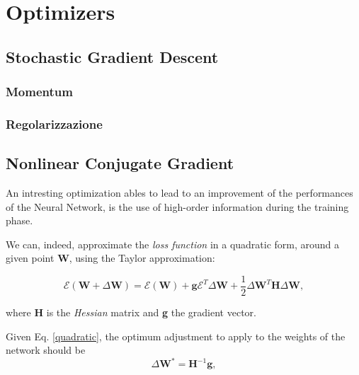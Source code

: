 \chapter{Optimizers} %
\label{cha:optimizers}
	\section{Stochastic Gradient Descent} %
	\label{sec:sgd}
	

		\subsection{Momentum} %
		\label{sec:momentum}
		

		\subsection{Regolarizzazione} %
		\label{sec:regolarizzazione}

	\section{Nonlinear Conjugate Gradient} %
	\label{sec:nonlinear_conjugate_gradient}
	
		An intresting optimization ables to lead to an improvement of the performances of the Neural Network, is the use of high-order information during the training phase.

		We can, indeed, approximate the \textit{loss function} in a quadratic form, around a given point \textbf{W}, using the Taylor approximation:

		 \begin{equation} 
		 	\label{quadratic}
		    \mathcal{E}(\textbf{W} + \Delta\textbf{W}) = \mathcal{E}(\textbf{W})+\textbf{g}\mathcal{E}^T\Delta\textbf{W}+ \frac{1}{2}\Delta\textbf{W}^T\textbf{H}\Delta\textbf{W},
		 \end{equation} 

		where \textbf{H} is the \textit{Hessian} matrix and \textbf{g} the gradient vector.

		Given Eq. \ref{quadratic}, the optimum adjustment to apply to the weights of the network should be 
 		\begin{equation} 
		 	\label{weight_star}
			\Delta\textbf{W}^* = \textbf{H}^{-1}\textbf{g},
		\end{equation} 

